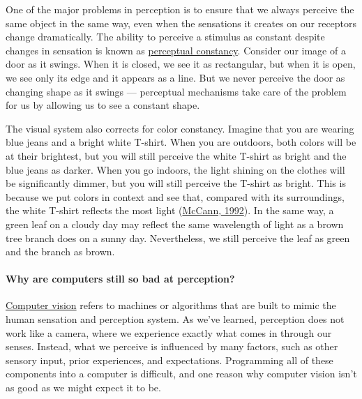 \documentclass[
]{krantz}
\begin{document}
One of the major problems in perception is to ensure that we always perceive the same object in the same way, even when the sensations it creates on our receptors change dramatically. The ability to perceive a stimulus as constant despite changes in sensation is known as \protect\hyperlink{perceptual-constancy}{perceptual constancy}. Consider our image of a door as it swings. When it is closed, we see it as rectangular, but when it is open, we see only its edge and it appears as a line. But we never perceive the door as changing shape as it swings --- perceptual mechanisms take care of the problem for us by allowing us to see a constant shape.

The visual system also corrects for color constancy. Imagine that you are wearing blue jeans and a bright white T-shirt. When you are outdoors, both colors will be at their brightest, but you will still perceive the white T-shirt as bright and the blue jeans as darker. When you go indoors, the light shining on the clothes will be significantly dimmer, but you will still perceive the T-shirt as bright. This is because we put colors in context and see that, compared with its surroundings, the white T-shirt reflects the most light (\protect\hyperlink{ref-McCann1992}{McCann, 1992}). In the same way, a green leaf on a cloudy day may reflect the same wavelength of light as a brown tree branch does on a sunny day. Nevertheless, we still perceive the leaf as green and the branch as brown.

\hypertarget{why-are-computers-still-so-bad-at-perception}{%
\paragraph*{Why are computers still so bad at perception?}\label{why-are-computers-still-so-bad-at-perception}}

\protect\hyperlink{computer-vision}{Computer vision} refers to machines or algorithms that are built to mimic the human sensation and perception system. As we've learned, perception does not work like a camera, where we experience exactly what comes in through our senses. Instead, what we perceive is influenced by many factors, such as other sensory input, prior experiences, and expectations. Programming all of these components into a computer is difficult, and one reason why computer vision isn't as good as we might expect it to be.
\end{document}

